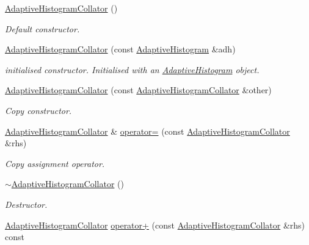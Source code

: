 \begin{DoxyCompactItemize}
\item 
\hyperlink{classsubpavings_1_1AdaptiveHistogramCollator_a0f1938c3bdc24026c034be889fd2bfe6}{\-Adaptive\-Histogram\-Collator} ()
\begin{DoxyCompactList}\small\item\em \-Default constructor. \end{DoxyCompactList}\item 
\hyperlink{classsubpavings_1_1AdaptiveHistogramCollator_a51aba61f8db338d32c2fa5a4de9648f6}{\-Adaptive\-Histogram\-Collator} (const \hyperlink{classsubpavings_1_1AdaptiveHistogram}{\-Adaptive\-Histogram} \&adh)
\begin{DoxyCompactList}\small\item\em initialised constructor. \-Initialised with an \hyperlink{classsubpavings_1_1AdaptiveHistogram}{\-Adaptive\-Histogram} object. \end{DoxyCompactList}\item 
\hyperlink{classsubpavings_1_1AdaptiveHistogramCollator_aca2fcef56fc73925701375fa0e551d8b}{\-Adaptive\-Histogram\-Collator} (const \hyperlink{classsubpavings_1_1AdaptiveHistogramCollator}{\-Adaptive\-Histogram\-Collator} \&other)
\begin{DoxyCompactList}\small\item\em \-Copy constructor. \end{DoxyCompactList}\item 
\hyperlink{classsubpavings_1_1AdaptiveHistogramCollator}{\-Adaptive\-Histogram\-Collator} \& \hyperlink{classsubpavings_1_1AdaptiveHistogramCollator_a812e5e60dd3d233274738d823c9010b2}{operator=} (const \hyperlink{classsubpavings_1_1AdaptiveHistogramCollator}{\-Adaptive\-Histogram\-Collator} \&rhs)
\begin{DoxyCompactList}\small\item\em \-Copy assignment operator. \end{DoxyCompactList}\item 
\hyperlink{classsubpavings_1_1AdaptiveHistogramCollator_a487740c9ae8d812861ff7847718924ff}{$\sim$\-Adaptive\-Histogram\-Collator} ()
\begin{DoxyCompactList}\small\item\em \-Destructor. \end{DoxyCompactList}\item 
\hyperlink{classsubpavings_1_1AdaptiveHistogramCollator}{\-Adaptive\-Histogram\-Collator} \hyperlink{classsubpavings_1_1AdaptiveHistogramCollator_a25deb4940f2a4df6ea84ad6ffe5090d3}{operator+} (const \hyperlink{classsubpavings_1_1AdaptiveHistogramCollator}{\-Adaptive\-Histogram\-Collator} \&rhs) const 

\end{DoxyCompactItemize}
